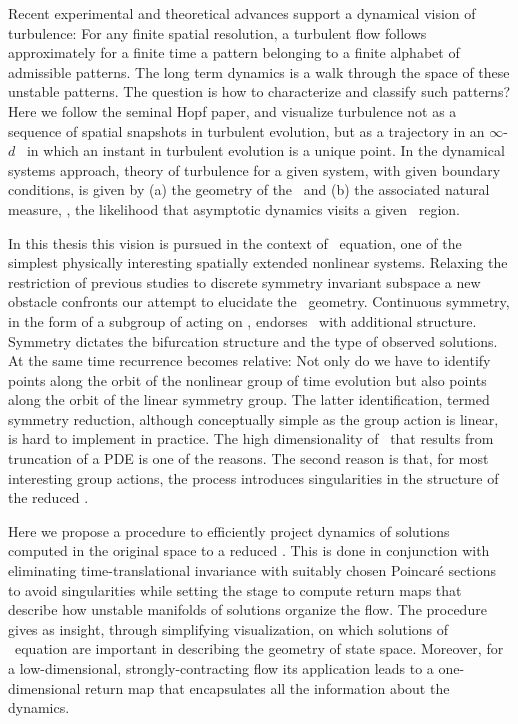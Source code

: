 

Recent experimental and theoretical advances
support a dynamical vision of turbulence:
For any finite  spatial resolution, a turbulent flow follows approximately for a finite time
a pattern belonging to a { finite alphabet} of admissible patterns.
The long term dynamics is a {walk through the space of these unstable patterns}.
The question is how to characterize and classify such patterns?
Here we follow the seminal Hopf paper, and  visualize
turbulence not as  a sequence of spatial snapshots in turbulent evolution,
but as a trajectory in an  $\infty$-$d$ \statesp\ in which an
instant in turbulent evolution is a {unique} point. In the dynamical systems approach,
theory of turbulence for a given system, with given boundary conditions,
is given by (a) the geometry of the \statesp\ and (b) the associated natural measure,
\ie, the likelihood that asymptotic dynamics visits a given \statesp\ region.

In this thesis this vision is pursued in the context of \KS\
equation, one of the simplest physically interesting spatially
extended nonlinear systems. Relaxing the restriction of
previous studies to discrete
symmetry invariant subspace a new obstacle confronts our
attempt to elucidate the \statesp\ geometry. Continuous
symmetry, in the form of a subgroup of  acting on
\statesp, endorses \statesp\ with additional structure.
Symmetry dictates the bifurcation structure and the type of
observed solutions. At the same time recurrence becomes
relative: Not only do we have to identify points along the
orbit of the nonlinear group of time evolution but also points
along the orbit of the linear symmetry group. The latter
identification, termed symmetry reduction, although
conceptually simple as the group action is linear, is hard to
implement in practice. The high dimensionality of \statesp\
that results from truncation of a PDE is one of the reasons.
The second reason is that, for most interesting group actions,
the process introduces singularities in the structure of the
reduced \statesp.

Here we propose a procedure to efficiently project dynamics of
solutions computed in the original space to a reduced \statesp.
This is done in conjunction with eliminating time-translational
invariance with suitably chosen Poincar\'e sections to avoid
singularities while setting the stage to compute return maps
that describe how unstable manifolds of solutions organize the
flow. The procedure gives as insight, through simplifying
visualization, on which solutions of \KS\ equation are
important in describing the geometry of state space. Moreover,
for a low-dimensional, strongly-contracting flow its
application leads to a one-dimensional return map that
encapsulates all the information about the dynamics.
